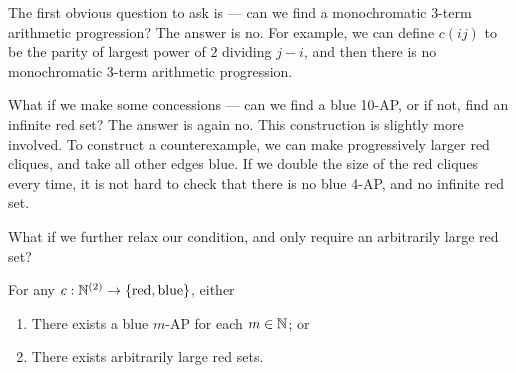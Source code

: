 \documentclass[a4paper]{article}
\begin{document}
  The first obvious question to ask is --- can we find a monochromatic 3-term arithmetic progression? The answer is no. For example, we can define $c(ij)$ to be the parity of largest power of $2$ dividing $j - i$, and then there is no monochromatic $3$-term arithmetic progression.

  What if we make some concessions --- can we find a blue 10-AP, or if not, find an infinite red set? The answer is again no. This construction is slightly more involved. To construct a counterexample, we can make progressively larger red cliques, and take all other edges blue. If we double the size of the red cliques every time, it is not hard to check that there is no blue 4-AP, and no infinite red set.
  \begin{center}
  \end{center}
  What if we further relax our condition, and only require an arbitrarily large red set?
  \begin{thm}
    For any $c: \mathbb{N}^{(2)} \to \{\mathrm{red}, \mathrm{blue}\}$, either
    \begin{enumerate}
    \item There exists a blue $m$-AP for each $m \in \mathbb{N}$; or
    \item There exists arbitrarily large red sets.
    \end{enumerate}
  \end{thm}
\end{document}
